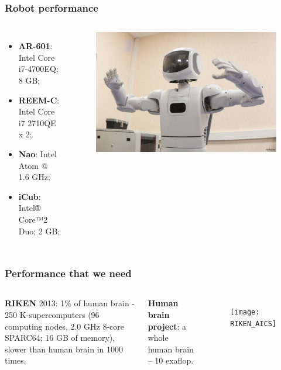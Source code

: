 \documentclass[12pt, aspectratio=169]{beamer}
\begin{document}
\begin{frame}
\frametitle{Robot performance}
\begin{columns}[c] %

\begin{itemize}
\item \textbf{AR-601}: Intel Core i7-4700EQ; 8 GB;
\item \textbf{REEM-C}: Intel Core i7 2710QE x 2;
\item \textbf{Nao}: Intel Atom @ 1.6 GHz;
\item \textbf{iCub}: Intel® Core™2 Duo; 2 GB;
\end{itemize}


\begin{figure}
\includegraphics[width=1.0\linewidth]{AR-601}
\end{figure}
\end{columns}
\end{frame}


\begin{frame}
\frametitle{Performance that we need}
\begin{columns}[c] %

\textbf{RIKEN} 2013: 1\% of human brain - 250 K-supercomputers
(96 computing nodes, 2.0 GHz 8-core SPARC64; 16 GB of memory), slower than human brain in 1000 times. 

\textbf{Human brain project}: a whole human brain -- 10 exaflop.


\begin{figure}
\texttt{[image: RIKEN\_AICS]}
\end{figure}
\end{columns}
\end{frame}
\end{document}
